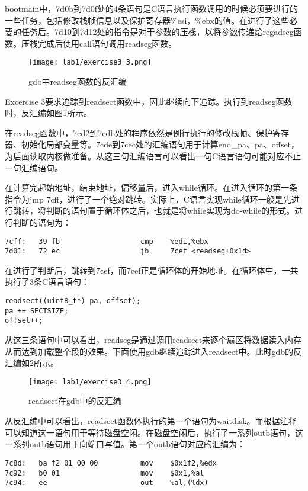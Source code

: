 \begin{exerciseSolution}{3}
\par bootmain中，7d0b到7d0f处的4条语句是C语言执行函数调用的时候必须要进行的一些任务，包括修改栈帧信息以及保护寄存器\%esi，\%ebx的值。在进行了这些必要的任务后。7d10到7d12处的指令是对于参数的压栈，以将参数传递给regadseg函数。压栈完成后使用call语句调用readseg函数。

\begin{figure}[htb]
    \centering
    \texttt{[image: lab1/exercise3\_3.png]}
    \caption{gdb中readseg函数的反汇编}
    \label{fig:exercise3_3}
\end{figure}
\par Excercise 3要求追踪到readsect函数中，因此继续向下追踪。执行到readseg函数时，反汇编如图\ref{fig:exercise3_3}所示。

\par 在readseg函数中，7cd2到7cdb处的程序依然是例行执行的修改栈帧、保护寄存器、初始化局部变量等。7cde到7cec处的汇编语句用于计算end\_pa、pa、offset，为后面读取内核做准备。从这三句汇编语言可以看出一句C语言语句可能对应不止一句汇编语句。
\par 在计算完起始地址，结束地址，偏移量后，进入while循环。在进入循环的第一条指令为jmp 7cff，进行了一个绝对跳转。实际上，C语言实现while循环一般是先进行跳转，将判断的语句置于循环体之后，也就是将while实现为do-while的形式。进行判断的语句为：
\begin{lstlisting}
7cff:	39 fb                	cmp    %edi,%ebx
7d01:	72 ec                	jb     7cef <readseg+0x1d>
\end{lstlisting}
\par 在进行了判断后，跳转到7cef，而7cef正是循环体的开始地址。在循环体中，一共执行了3条C语言语句：
\begin{lstlisting}
readsect((uint8_t*) pa, offset);
pa += SECTSIZE;
offset++;
\end{lstlisting}

\par 从这三条语句中可以看出，readseg是通过调用readsect来逐个扇区将数据读入内存从而达到加载整个段的效果。下面使用gdb继续追踪进入readsect中。此时gdb的反汇编如\ref{fig:exercise3_4}所示。
\begin{figure}[htb]
    \centering
    \texttt{[image: lab1/exercise3\_4.png]}
    \caption{readsect在gdb中的反汇编}
    \label{fig:exercise3_4}
\end{figure}

\par 从反汇编中可以看出，readsect函数体执行的第一个语句为waitdisk。而根据注释可以知道这一语句用于等待磁盘空闲。在磁盘空闲后，执行了一系列outb语句，这一系列outb语句用于向端口写值。第一个outb语句对应的汇编为：
\begin{lstlisting}
7c8d:	ba f2 01 00 00       	mov    $0x1f2,%edx
7c92:	b0 01                	mov    $0x1,%al
7c94:	ee                   	out    %al,(%dx)
\end{lstlisting}


\end{exerciseSolution}
